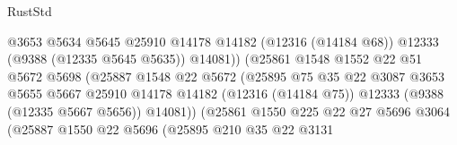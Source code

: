 \begin{lexlean}{RustStd}
\begin{coremodule}
                                          @3653
                                          @5634
                                          @5645
                                          @25910
                                          @14178
                                          @14182
                                          (@12316 (@14184 @68))
                                          @12333
                                          (@9388 (@12335 @5645 @5635))
                                          @14081))
                                      (@25861
                                        @1548
                                        @1552
                                        @22
                                        @51
                                        @5672
                                        @5698
                                        (@25887
                                          @1548
                                          @22
                                          @5672
                                          (@25895
                                            @75
                                            @35
                                            @22
                                            @3087
                                            @3653
                                            @5655
                                            @5667
                                            @25910
                                            @14178
                                            @14182
                                            (@12316 (@14184 @75))
                                            @12333
                                            (@9388 (@12335 @5667 @5656))
                                            @14081))
                                        (@25861
                                          @1550
                                          @225
                                          @22
                                          @27
                                          @5696
                                          @3064
                                          (@25887
                                            @1550
                                            @22
                                            @5696
                                            (@25895
                                              @210
                                              @35
                                              @22
                                              @3131

\end{coremodule}
\end{lexlean}
